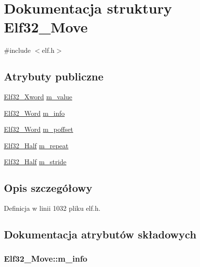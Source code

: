 \hypertarget{struct_elf32___move}{\section{Dokumentacja struktury Elf32\-\_\-\-Move}
\label{struct_elf32___move}
}


{\ttfamily \#include $<$elf.\-h$>$}

\subsection*{Atrybuty publiczne}
\begin{DoxyCompactItemize}
\item 
\hyperlink{elf_8h_a06e429ed15bc1257d859cca67c4dddd9}{Elf32\-\_\-\-Xword} \hyperlink{struct_elf32___move_ab9db1554472a8b54101e38298aabde19}{m\-\_\-value}
\item 
\hyperlink{elf_8h_af5924ece606c732e86f8263a19408e45}{Elf32\-\_\-\-Word} \hyperlink{struct_elf32___move_a25c402d8b1991f61f6ecc539368cd99a}{m\-\_\-info}
\item 
\hyperlink{elf_8h_af5924ece606c732e86f8263a19408e45}{Elf32\-\_\-\-Word} \hyperlink{struct_elf32___move_a4b1119df05b7672effd0afb09b258f85}{m\-\_\-poffset}
\item 
\hyperlink{elf_8h_a2ff0787d7d1bae0f251192806a2974ca}{Elf32\-\_\-\-Half} \hyperlink{struct_elf32___move_a84620f9a22f6a4b0f8a8a6c4e332f600}{m\-\_\-repeat}
\item 
\hyperlink{elf_8h_a2ff0787d7d1bae0f251192806a2974ca}{Elf32\-\_\-\-Half} \hyperlink{struct_elf32___move_a85ca12bb9ac30146a8533fccfe601b43}{m\-\_\-stride}
\end{DoxyCompactItemize}


\subsection{Opis szczegółowy}


Definicja w linii 1032 pliku elf.\-h.



\subsection{Dokumentacja atrybutów składowych}
\hypertarget{struct_elf32___move_a25c402d8b1991f61f6ecc539368cd99a}{
\subsubsection[{m\-\_\-info}]{ Elf32\-\_\-\-Move\-::m\-\_\-info}}\label{struct_elf32___move_a25c402d8b1991f61f6ecc539368cd99a}


